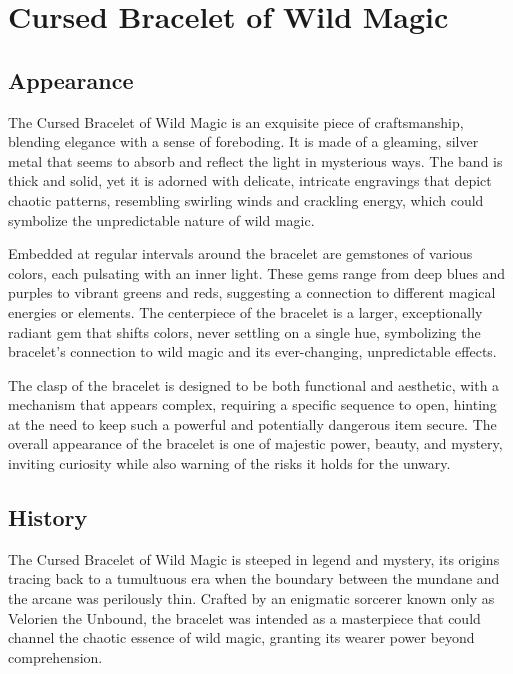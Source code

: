 
\chapter*{Cursed Bracelet of Wild Magic}

\section*{Appearance}
The Cursed Bracelet of Wild Magic is an exquisite piece of craftsmanship, blending elegance with a sense of foreboding. It is made of a gleaming, silver metal that seems to absorb and reflect the light in mysterious ways. The band is thick and solid, yet it is adorned with delicate, intricate engravings that depict chaotic patterns, resembling swirling winds and crackling energy, which could symbolize the unpredictable nature of wild magic.

Embedded at regular intervals around the bracelet are gemstones of various colors, each pulsating with an inner light. These gems range from deep blues and purples to vibrant greens and reds, suggesting a connection to different magical energies or elements. The centerpiece of the bracelet is a larger, exceptionally radiant gem that shifts colors, never settling on a single hue, symbolizing the bracelet's connection to wild magic and its ever-changing, unpredictable effects.

The clasp of the bracelet is designed to be both functional and aesthetic, with a mechanism that appears complex, requiring a specific sequence to open, hinting at the need to keep such a powerful and potentially dangerous item secure. The overall appearance of the bracelet is one of majestic power, beauty, and mystery, inviting curiosity while also warning of the risks it holds for the unwary.

\section*{History}
The Cursed Bracelet of Wild Magic is steeped in legend and mystery, its origins tracing back to a tumultuous era when the boundary between the mundane and the arcane was perilously thin. Crafted by an enigmatic sorcerer known only as Velorien the Unbound, the bracelet was intended as a masterpiece that could channel the chaotic essence of wild magic, granting its wearer power beyond comprehension.


